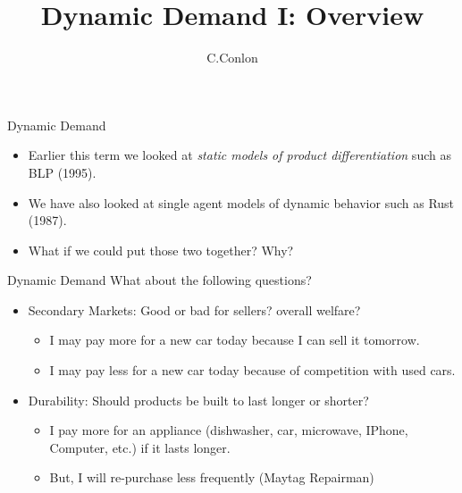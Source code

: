 

\title [Dynamic Demand II]{Dynamic Demand I: Overview }
\author{C.Conlon}
\date{}





\begin{frame}
\titlepage
\end{frame}


\begin{frame}{Dynamic Demand}
\begin{itemize}
\item Earlier this term we looked at \textit{static models of product differentiation} such as BLP (1995).
\item We have also looked at single agent models of dynamic behavior such as Rust (1987).
\item What if we could put those two together? Why?
\end{itemize}
\end{frame}

\begin{frame}{Dynamic Demand}
What about the following questions?
\begin{itemize}
\item Secondary Markets: Good or bad for sellers? overall welfare?
\begin{itemize}
\item I may pay \alert{more} for a new car today because I can sell it tomorrow.
\item I may pay \alert{less} for a new car today because of competition with used cars.
\end{itemize}
\item Durability: Should products be built to last longer or shorter?
\begin{itemize}
\item I pay \alert{more} for an appliance (dishwasher, car, microwave, IPhone, Computer, etc.) if it 
\alert{lasts longer}.
\item But, I will re-purchase less frequently (Maytag Repairman)
\end{itemize}
\end{itemize}
\end{frame}


